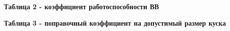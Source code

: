{\bfseries Таблица 2 - коэффициент работоспособности ВВ}

% 
% 
% 
% 
% 
% 
% 
% 
% 
% 
% 
% 
% 
% 
% 
% 
% 
% 
% 
% 
% 
% 
% 
% 
% 
% 
% 
% 
% 
% 
% 
% 
% 
% 
% 
% 
% 
% 

{\bfseries Таблица 3 - поправочный коэффициент на допустимый размер куска}

% 
% 

